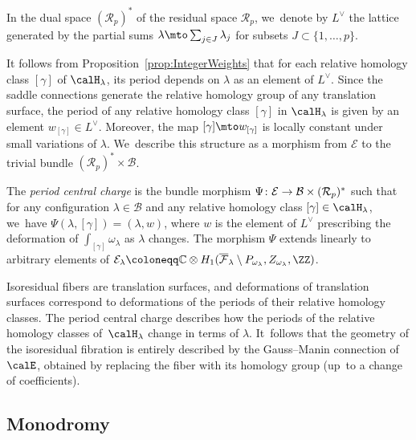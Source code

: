 
\begin{defn}\label{defn:DualLattice}
In the dual space $(\mathcal{R}_{p})^{\ast}$ of the residual space $\mathcal{R}_{p}$, we~denote by $L^{\vee}$ the lattice generated by the partial sums $\lambda \mto \sum_{j \in J} \lambda_j$ for subsets $J\subset \{1,\ldots,p\}$.
\end{defn}

It follows from Proposition~\ref{prop:IntegerWeights} that for each relative homology class $[\gamma]$ of $\calH_{\lambda}$, its period depends on $\lambda$ as an element of $L^{\vee}$. Since the saddle connections generate the relative homology group of any translation surface, the period of any relative homology class $[\gamma]$ in $\calH_{\lambda}$ is given by an element $w_{[\gamma]}\in L^{\vee}$. Moreover, the map $[\gamma]\mto w_{[\gamma]}$ is locally constant under small variations of $\lambda$. We~describe this structure as a morphism from $\mathcal{E}$ to the trivial bundle $(\mathcal{R}_{p})^{\ast} \times \mathcal{B}$.

\begin{defn}
The \textit{period central charge} is the bundle morphism $\Psi\colon\mathcal{E} \to \mathcal{B}\times\nobreak (\mathcal{R}_{p})^{\ast} $ such that for any configuration $\lambda \in \mathcal{B}$ and any relative homology class $[\gamma] \in \calH_{\lambda}$, we~have $\Psi(\lambda,[\gamma])=(\lambda,w)$, where $w$ is the element of $L^{\vee}$ prescribing the deformation of $\int_{[\gamma]} \omega_{\lambda}$ as $\lambda$ changes. The morphism $\Psi$ extends linearly to arbitrary elements of $\mathcal{E}_{\lambda} \coloneqq \mathbb{C} \otimes H_{1}(\overline{\mathcal{F}}_{\lambda} \setminus P_{\omega_{\lambda}}, Z_{\omega_{\lambda}},\ZZ)$.
\end{defn}

Isoresidual fibers are translation surfaces, and deformations of translation surfaces correspond to deformations of the periods of their relative homology classes. The period central charge describes how the periods of the relative homology classes of~$\calH_{\lambda}$ change in terms of $\lambda$. It~follows that the geometry of the isoresidual fibration is entirely described by the Gauss--Manin connection of $\calE$, obtained by replacing the fiber with its homology group (up~to a change of coefficients).

\subsection{Monodromy}\label{sub:Monodromy}

